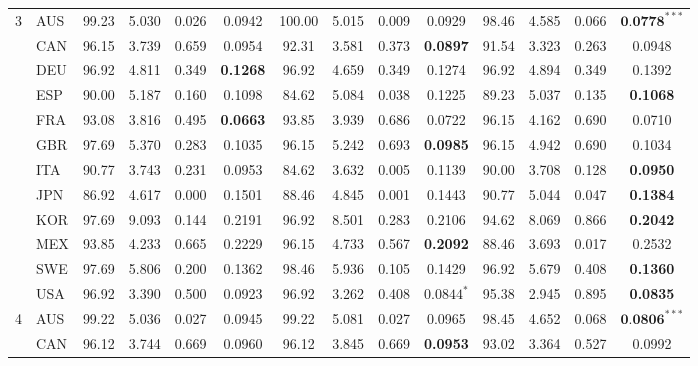 \begin{tabular}{llcccccccccccc}
\toprule
\multirow{12}{*}{{3}}
                        &  AUS  &  99.23  &  5.030  &  0.026  &  0.0942  &  100.00  &  5.015  &  0.009  &  0.0929  &  98.46  &  4.585  &  0.066  & $\textbf{0.0778}^{***}$ \\
 &     CAN  &  96.15  &  3.739  &  0.659  &  0.0954  &  92.31  &  3.581  &  0.373  &  \textbf{0.0897}  &  91.54  &  3.323  &  0.263  &  0.0948 \\ 
 &     DEU  &  96.92  &  4.811  &  0.349  &  \textbf{0.1268}  &  96.92  &  4.659  &  0.349  &  0.1274  &  96.92  &  4.894  &  0.349  &  0.1392 \\ 
 &     ESP  &  90.00  &  5.187  &  0.160  &  0.1098  &  84.62  &  5.084  &  0.038  &  0.1225  &  89.23  &  5.037  &  0.135  &  \textbf{0.1068} \\ 
 &     FRA  &  93.08  &  3.816  &  0.495  &  \textbf{0.0663}  &  93.85  &  3.939  &  0.686  &  0.0722  &  96.15  &  4.162  &  0.690  &  0.0710 \\ 
 &     GBR  &  97.69  &  5.370  &  0.283  &  0.1035  &  96.15  &  5.242  &  0.693  &  \textbf{0.0985}  &  96.15  &  4.942  &  0.690  &  0.1034 \\ 
 &     ITA  &  90.77  &  3.743  &  0.231  &  0.0953  &  84.62  &  3.632  &  0.005  &  0.1139  &  90.00  &  3.708  &  0.128  &  \textbf{0.0950} \\ 
 &     JPN  &  86.92  &  4.617  &  0.000  &  0.1501  &  88.46  &  4.845  &  0.001  &  0.1443  &  90.77  &  5.044  &  0.047  &  \textbf{0.1384} \\ 
 &     KOR  &  97.69  &  9.093  &  0.144  &  0.2191  &  96.92  &  8.501  &  0.283  &  0.2106  &  94.62  &  8.069  &  0.866  &  \textbf{0.2042} \\ 
 &     MEX  &  93.85  &  4.233  &  0.665  &  0.2229  &  96.15  &  4.733  &  0.567  &  \textbf{0.2092}  &  88.46  &  3.693  &  0.017  &  0.2532 \\ 
 &     SWE  &  97.69  &  5.806  &  0.200  &  0.1362  &  98.46  &  5.936  &  0.105  &  0.1429  &  96.92  &  5.679  &  0.408  &  \textbf{0.1360} \\ 
 &     USA  &  96.92  &  3.390  &  0.500  &  0.0923  &  96.92  &  3.262  &  0.408  & $ 0.0844 ^{*}$ &  95.38  &  2.945  &  0.895  &  \textbf{0.0835} \\ 
\toprule
\multirow{12}{*}{{4}}
                        &  AUS  &  99.22  &  5.036  &  0.027  &  0.0945  &  99.22  &  5.081  &  0.027  &  0.0965  &  98.45  &  4.652  &  0.068  & $\textbf{0.0806}^{***}$ \\
 &     CAN  &  96.12  &  3.744  &  0.669  &  0.0960  &  96.12  &  3.845  &  0.669  &  \textbf{0.0953}  &  93.02  &  3.364  &  0.527  &  0.0992 \\ 

\end{tabular}
